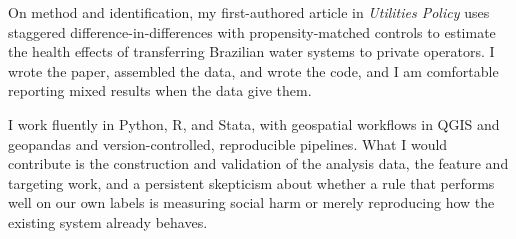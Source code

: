 On method and identification, my first-authored article in \textit{Utilities Policy} uses staggered difference-in-differences with propensity-matched controls to estimate the health effects of transferring Brazilian water systems to private operators. I wrote the paper, assembled the data, and wrote the code, and I am comfortable reporting mixed results when the data give them.

I work fluently in Python, R, and Stata, with geospatial workflows in QGIS and geopandas and version-controlled, reproducible pipelines. What I would contribute is the construction and validation of the analysis data, the feature and targeting work, and a persistent skepticism about whether a rule that performs well on our own labels is measuring social harm or merely reproducing how the existing system already behaves.


